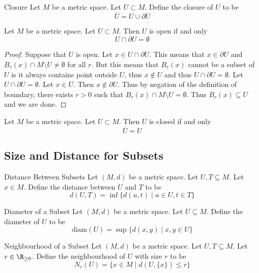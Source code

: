 \documentclass[a4paper]{article}
\begin{document}
\begin{defn}{Closure}{} Let $M$ be a metric space. Let $U\subset M$. Define the closure of $U$ to be $$\overline{U}=U\cup\partial U$$
\end{defn}

\begin{prp}{}{} Let $M$ be a metric space. Let $U\subset M$. Then $U$ is open if and only $$U\cap\partial U=\emptyset$$ \tcbline
\begin{proof}
Suppose that $U$ is open. Let $x\in U\cap\partial U$. This means that $x\in\partial U$ and $B_r(x)\cap M\setminus U\neq\emptyset$ for all $r$. But this means that $B_r(x)$ cannot be a subset of $U$ is it always contains point outside $U$, thus $x\notin U$ and thus $U\cap\partial U=\emptyset$. \linebreak\linebreak
Let $U\cap\partial U=\emptyset$. Let $x\in U$. Then $x\notin\partial U$. Thus by negation of the definition of boundary, there exists $r>0$ such that $B_r(x)\cap M\setminus U=\emptyset$. Thus $B_r(x)\subseteq U$ and we are done. 
\end{proof}
\end{prp}

\begin{prp}{}{} Let $M$ be a metric space. Let $U\subset M$. Then $U$ is closed if and only $$\overline{U}=U$$
\end{prp}

\subsection{Size and Distance for Subsets}
\begin{defn}{Distance Between Subsets}{} Let $(M,d)$ be a metric space. Let $U,T\subseteq M$. Let $x\in M$. Define the distance between $U$ and $T$ to be $$d(U,T)=\inf\{d(u,t)\;|\;u\in U,t\in T\}$$
\end{defn}

\begin{defn}{Diameter of a Subset}{} Let $(M,d)$ be a metric space. Let $U\subseteq M$. Define the diameter of $U$ to be $$\text{diam}(U)=\sup\{d(x,y)\;|\;x,y\in U\}$$
\end{defn}

\begin{defn}{Neighbourhood of a Subset}{} Let $(M,d)$ be a metric space. Let $U,T\subseteq M$. Let $r\in\R_{\geq 0}$. Define the neighbourhood of $U$ with size $r$ to be $$N_r(U)=\{x\in M\;|\;d(U,\{x\})\leq r\}$$
\end{defn}
\end{document}
